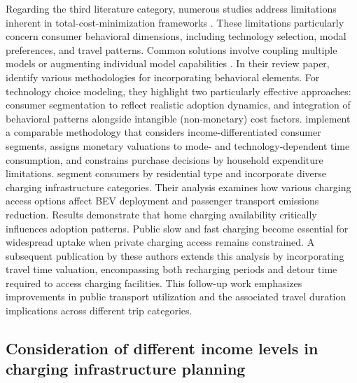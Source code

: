        Regarding the third literature category, numerous studies address limitations inherent in total-cost-minimization frameworks \citep{TATTINI2018265, PATIL2023104265}. These limitations particularly concern consumer behavioral dimensions, including technology selection, modal preferences, and travel patterns. Common solutions involve coupling multiple models or augmenting individual model capabilities \citep{luh2022behavior}. In their review paper, \citet{Venturini2019} identify various methodologies for incorporating behavioral elements. For technology choice modeling, they highlight two particularly effective approaches: consumer segmentation to reflect realistic adoption dynamics, and integration of behavioral patterns alongside intangible (non-monetary) cost factors. \citet{TATTINI2018265} implement a comparable methodology that considers income-differentiated consumer segments, assigns monetary valuations to mode- and technology-dependent time consumption, and constrains purchase decisions by household expenditure limitations. \citet{luh2022behavior} segment consumers by residential type and incorporate diverse charging infrastructure categories. Their analysis examines how various charging access options affect \ac{BEV} deployment and passenger transport emissions reduction. Results demonstrate that home charging availability critically influences adoption patterns. Public slow and fast charging become essential for widespread uptake when private charging access remains constrained. A subsequent publication by these authors \citep{LUH2024122412} extends this analysis by incorporating travel time valuation, encompassing both recharging periods and detour time required to access charging facilities. This follow-up work emphasizes improvements in public transport utilization and the associated travel duration implications across different trip categories.

        \subsection{Consideration of different income levels in charging infrastructure planning}
        
